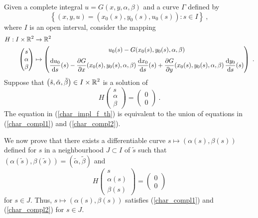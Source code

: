 \begin{rmk}
Given a complete integral $u=G(x,y,\alpha,\beta)$ and a curve $\Gamma$
defined by
\[
\left\{ (x,y,u) = (x_0(s), y_0(s), u_0(s)) : s \in I \right\} \ ,
\]
where $I$ is an open interval, consider the mapping
\begin{align*}
H:I \times \mathbb{R}^2 & \rightarrow \mathbb{R}^2 \\
\begin{pmatrix}
s \\
\alpha \\
\beta
\end{pmatrix}
&\mapsto
\begin{pmatrix}
u_0(s) - G(x_0(s), y_0(s), \alpha, \beta) \\[0.7em]
\displaystyle  \frac{\mathrm{d}u_0}{\mathrm{d}{s}}(s) - \frac{\partial{G}}{\partial x}(x_0(s),y_0(s), \alpha, \beta)\,
\frac{\mathrm{d}x_0}{\mathrm{d}{s}}(s) + \frac{\partial{G}}{\partial y}(x_0(s),y_0(s), \alpha, \beta)\,
\frac{\mathrm{d}y_0}{\mathrm{d}{s}}(s)
\end{pmatrix} \ .
\end{align*}
Suppose that
$\displaystyle \left(\tilde{s}, \tilde{\alpha}, \tilde{\beta}\right)
\in I \times \mathbb{R}^2$ is a solution of
\begin{equation} \label{char_impl_f_th}
H\begin{pmatrix} s \\ \alpha \\ \beta \end{pmatrix} =
\begin{pmatrix} 0 \\ 0 \end{pmatrix}  \ .
\end{equation}
The equation in (\ref{char_impl_f_th}) is equivalent to the union of
equations in (\ref{char_compl1}) and (\ref{char_compl2}).

We now prove that there exists a differentiable curve
$s\mapsto (\alpha(s),\beta(s))$ defined for $s$ in a neighbourhood
$J \subset I$ of $\tilde{s}$ such that
$\displaystyle \left(\alpha\left(\tilde{s}\right),
\beta\left(\tilde{s}\right)\right)
= (\tilde{\alpha},\tilde{\beta})$ and
\begin{equation} \label{char_impl_f_thLocal}
  H\begin{pmatrix} s \\ \alpha(s) \\ \beta(s) \end{pmatrix} =
\begin{pmatrix} 0 \\ 0 \end{pmatrix}
\end{equation}
for $s \in J$.  Thus, $s\mapsto (\alpha(s),\beta(s))$ satisfies
(\ref{char_compl1}) and (\ref{char_compl2}) for $s \in J$.


\end{rmk}
